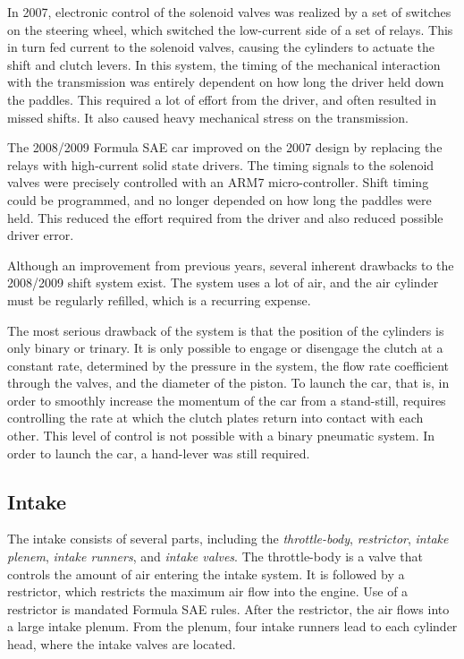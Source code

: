 In 2007, electronic control of the solenoid valves was realized by a set of switches on the steering wheel, which switched the low-current side of a set of relays. This in turn fed current to the solenoid valves, causing the cylinders to actuate the shift and clutch levers. In this system, the timing of the mechanical interaction with the transmission was entirely dependent on how long the driver held down the paddles. This required a lot of effort from the driver, and often resulted in missed shifts. It also caused heavy mechanical stress on the transmission. 

The 2008/2009 Formula SAE car improved on the 2007 design by replacing the relays with high-current solid state drivers. The timing signals to the solenoid valves were precisely controlled with an ARM7 micro-controller. Shift timing could be programmed, and no longer depended on how long the paddles were held. This  reduced the effort required from the driver and also reduced possible driver error.

Although an improvement from previous years, several inherent drawbacks to the 2008/2009 shift system exist. The system uses a lot of air, and the air cylinder must be regularly refilled, which is a recurring expense.

The most serious drawback of the system is that the position of the cylinders is only binary or trinary. It is only possible to engage or disengage the clutch at a constant rate, determined by the pressure in the system, the flow rate coefficient through the valves, and the diameter of the piston. To launch the car, that is, in order to smoothly increase the momentum of the car from a stand-still, requires controlling the rate at which the clutch plates return into contact with each other. This level of control is not possible with a binary pneumatic system. In order to launch the car, a hand-lever was still required.

\subsection{Intake}

The intake consists of several parts, including the \emph{throttle-body}, \emph{restrictor}, \emph{intake plenem}, \emph{intake runners}, and \emph{intake valves}. The throttle-body is a valve that controls the amount of air entering the intake system. It is followed by a restrictor, which restricts the maximum air flow into the engine. Use of a restrictor is mandated Formula SAE rules. After the restrictor, the air flows into a large intake plenum. From the plenum, four intake runners lead to each cylinder head, where the intake valves are located.

